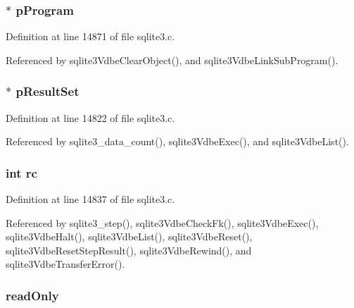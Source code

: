\hypertarget{struct_vdbe_a3b92cb4ee986d1dfaf28a5ade854311c}{}
\subsubsection[{p\+Program}]{$\ast$ p\+Program}\label{struct_vdbe_a3b92cb4ee986d1dfaf28a5ade854311c}


Definition at line 14871 of file sqlite3.\+c.



Referenced by sqlite3\+Vdbe\+Clear\+Object(), and sqlite3\+Vdbe\+Link\+Sub\+Program().

\hypertarget{struct_vdbe_a879fc40450f639139fce2a774e02dd95}{}
\subsubsection[{p\+Result\+Set}]{$\ast$ p\+Result\+Set}\label{struct_vdbe_a879fc40450f639139fce2a774e02dd95}


Definition at line 14822 of file sqlite3.\+c.



Referenced by sqlite3\+\_\+data\+\_\+count(), sqlite3\+Vdbe\+Exec(), and sqlite3\+Vdbe\+List().

\hypertarget{struct_vdbe_ac6509c6fe4cbf7bde170597172f8a288}{}
\subsubsection[{rc}]{\setlength{\rightskip}{0pt plus 5cm}int rc}\label{struct_vdbe_ac6509c6fe4cbf7bde170597172f8a288}


Definition at line 14837 of file sqlite3.\+c.



Referenced by sqlite3\+\_\+step(), sqlite3\+Vdbe\+Check\+Fk(), sqlite3\+Vdbe\+Exec(), sqlite3\+Vdbe\+Halt(), sqlite3\+Vdbe\+List(), sqlite3\+Vdbe\+Reset(), sqlite3\+Vdbe\+Reset\+Step\+Result(), sqlite3\+Vdbe\+Rewind(), and sqlite3\+Vdbe\+Transfer\+Error().

\hypertarget{struct_vdbe_a5a6264721864a9d3c1f669ece146bec5}{}
\subsubsection[{read\+Only}]{ read\+Only}\label{struct_vdbe_a5a6264721864a9d3c1f669ece146bec5}


